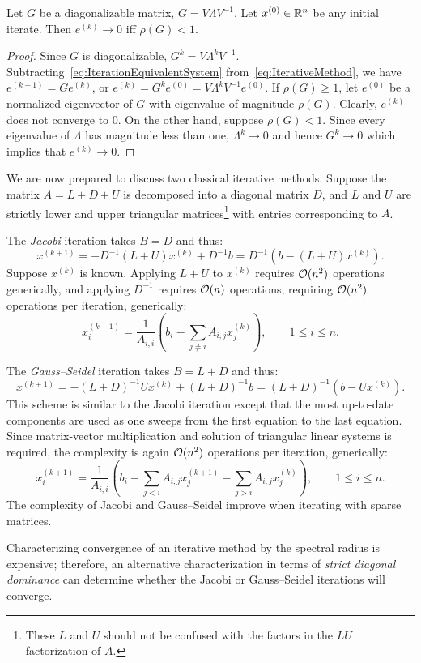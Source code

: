 \begin{theorem}
Let $G$ be a diagonalizable matrix, $G = V\Lambda V^{-1}$. Let $x^{(0)}\in\mathbb{R}^n$ be any initial iterate. Then $e^{(k)}\to 0$ iff $\rho(G)<1$.
\end{theorem}
\begin{proof}
Since $G$ is diagonalizable, $G^k = V\Lambda^kV^{-1}$. Subtracting~\eqref{eq:IterationEquivalentSystem} from~\eqref{eq:IterativeMethod}, we have $e^{(k+1)} = Ge^{(k)}$, or $e^{(k)} = G^ke^{(0)} = V\Lambda^kV^{-1} e^{(0)}$. If $\rho(G)\ge1$, let $e^{(0)}$ be a normalized eigenvector of $G$ with eigenvalue of magnitude $\rho(G)$. Clearly, $e^{(k)}$ does not converge to $0$. On the other hand, suppose $\rho(G)<1$. Since every eigenvalue of $\Lambda$ has magnitude less than one, $\Lambda^k\to0$ and hence $G^k\to0$ which implies that $e^{(k)}\to0$.
\end{proof}

We are now prepared to discuss two classical iterative methods. Suppose the matrix $A = L+D+U$ is decomposed into a diagonal matrix $D$, and $L$ and $U$ are strictly lower and upper triangular matrices\footnote{These $L$ and $U$ should not be confused with the factors in the $LU$ factorization of $A$.} with entries corresponding to $A$.

The {\em Jacobi} iteration takes $B=D$ and thus:
\[
x^{(k+1)} = -D^{-1}(L+U)x^{(k)} + D^{-1}b = D^{-1}(b-(L+U)x^{(k)}).
\]
Suppose $x^{(k)}$ is known. Applying $L+U$ to $x^{(k)}$ requires $\mathcal{O}(n^2)$ operations generically, and applying $D^{-1}$ requires $\mathcal{O}(n)$ operations, requiring $\mathcal{O}(n^2)$ operations per iteration, generically:
\[
x_i^{(k+1)} = \dfrac{1}{A_{i,i}}\left(b_i-\sum_{j\ne i}A_{i,j}x_j^{(k)}\right),\qquad 1\le i\le n.
\]

The {\em Gauss--Seidel} iteration takes $B=L+D$ and thus:
\[
x^{(k+1)} = -(L+D)^{-1}Ux^{(k)} + (L+D)^{-1}b = (L+D)^{-1}(b-Ux^{(k)}).
\]
This scheme is similar to the Jacobi iteration except that the most up-to-date components are used as one sweeps from the first equation to the last equation. Since matrix-vector multiplication and solution of triangular linear systems is required, the complexity is again $\mathcal{O}(n^2)$ operations per iteration, generically:
\[
x_i^{(k+1)} = \dfrac{1}{A_{i,i}}\left(b_i-\sum_{j< i}A_{i,j}x_j^{(k+1)} - \sum_{j>i}A_{i,j}x_j^{(k)}\right),\qquad 1\le i\le n.
\]
The complexity of Jacobi and Gauss--Seidel improve when iterating with sparse matrices.

Characterizing convergence of an iterative method by the spectral radius is expensive; therefore, an alternative characterization in terms of {\em strict diagonal dominance} can determine whether the Jacobi or Gauss--Seidel iterations will converge.

